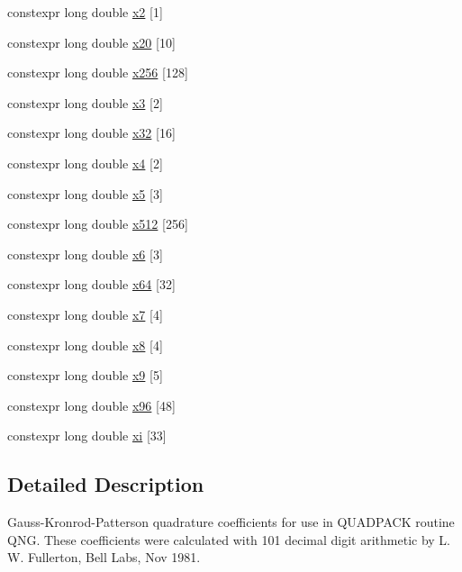 \begin{DoxyCompactItemize}
\item 
constexpr long double \hyperlink{namespace____gnu__cxx_a0001a0bc4eebf0b8d542f860d9d629ca}{x2} \mbox{[}1\mbox{]}
\item 
constexpr long double \hyperlink{namespace____gnu__cxx_ab62325d60ce77ad6bb9c699a3d1531fd}{x20} \mbox{[}10\mbox{]}
\item 
constexpr long double \hyperlink{namespace____gnu__cxx_a916f81da20702c32146d4bd046ff2f64}{x256} \mbox{[}128\mbox{]}
\item 
constexpr long double \hyperlink{namespace____gnu__cxx_a66d14d8d393a6dd426ebbca2e59a2ce1}{x3} \mbox{[}2\mbox{]}
\item 
constexpr long double \hyperlink{namespace____gnu__cxx_aa2b1a25aef18450e1226996325a917f0}{x32} \mbox{[}16\mbox{]}
\item 
constexpr long double \hyperlink{namespace____gnu__cxx_ab3836a2d30cb0608c5e0f7369fe64992}{x4} \mbox{[}2\mbox{]}
\item 
constexpr long double \hyperlink{namespace____gnu__cxx_acd6b6d22a84682bef2ab51e21dcf61d1}{x5} \mbox{[}3\mbox{]}
\item 
constexpr long double \hyperlink{namespace____gnu__cxx_af4191de87bfd6d41b9db60ee6af7d74b}{x512} \mbox{[}256\mbox{]}
\item 
constexpr long double \hyperlink{namespace____gnu__cxx_ae1c9116023ca718e1eb7b2ab333c8d2c}{x6} \mbox{[}3\mbox{]}
\item 
constexpr long double \hyperlink{namespace____gnu__cxx_a06387c8c35c954980122bd426c11ed55}{x64} \mbox{[}32\mbox{]}
\item 
constexpr long double \hyperlink{namespace____gnu__cxx_a0e46aeba235d10d7b235b1ece99d0298}{x7} \mbox{[}4\mbox{]}
\item 
constexpr long double \hyperlink{namespace____gnu__cxx_ae20f2ba117285e47819e8fed2ac274bd}{x8} \mbox{[}4\mbox{]}
\item 
constexpr long double \hyperlink{namespace____gnu__cxx_a6477dcd8d66b656365b3f4da621566e0}{x9} \mbox{[}5\mbox{]}
\item 
constexpr long double \hyperlink{namespace____gnu__cxx_a519eff5db482d90d5e4f6d3e3d0b0885}{x96} \mbox{[}48\mbox{]}
\item 
constexpr long double \hyperlink{namespace____gnu__cxx_a8a912ee89c90a7e5049ce5ffad04274b}{xi} \mbox{[}33\mbox{]}
\end{DoxyCompactItemize}


\subsection{Detailed Description}
Gauss-\/\+Kronrod-\/\+Patterson quadrature coefficients for use in Q\+U\+A\+D\+P\+A\+CK routine Q\+NG. These coefficients were calculated with 101 decimal digit arithmetic by L. W. Fullerton, Bell Labs, Nov 1981. 

